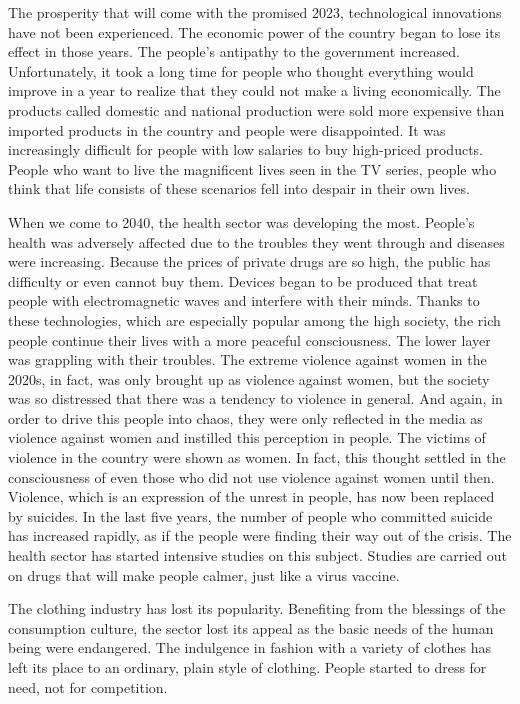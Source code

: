 \documentclass[]{book}
\begin{document}
The prosperity that will come with the promised 2023, technological innovations have not been experienced. The economic power of the country began to lose its effect in those years. The people's antipathy to the government increased. Unfortunately, it took a long time for people who thought everything would improve in a year to realize that they could not make a living economically. The products called domestic and national production were sold more expensive than imported products in the country and people were disappointed. It was increasingly difficult for people with low salaries to buy high-priced products. People who want to live the magnificent lives seen in the TV series, people who think that life consists of these scenarios fell into despair in their own lives.

When we come to 2040, the health sector was developing the most. People's health was adversely affected due to the troubles they went through and diseases were increasing. Because the prices of private drugs are so high, the public has difficulty or even cannot buy them. Devices began to be produced that treat people with electromagnetic waves and interfere with their minds. Thanks to these technologies, which are especially popular among the high society, the rich people continue their lives with a more peaceful consciousness. The lower layer was grappling with their troubles. The extreme violence against women in the 2020s, in fact, was only brought up as violence against women, but the society was so distressed that there was a tendency to violence in general. And again, in order to drive this people into chaos, they were only reflected in the media as violence against women and instilled this perception in people. The victims of violence in the country were shown as women. In fact, this thought settled in the consciousness of even those who did not use violence against women until then. Violence, which is an expression of the unrest in people, has now been replaced by suicides. In the last five years, the number of people who committed suicide has increased rapidly, as if the people were finding their way out of the crisis. The health sector has started intensive studies on this subject. Studies are carried out on drugs that will make people calmer, just like a virus vaccine.

The clothing industry has lost its popularity. Benefiting from the blessings of the consumption culture, the sector lost its appeal as the basic needs of the human being were endangered. The indulgence in fashion with a variety of clothes has left its place to an ordinary, plain style of clothing. People started to dress for need, not for competition.
\end{document}
